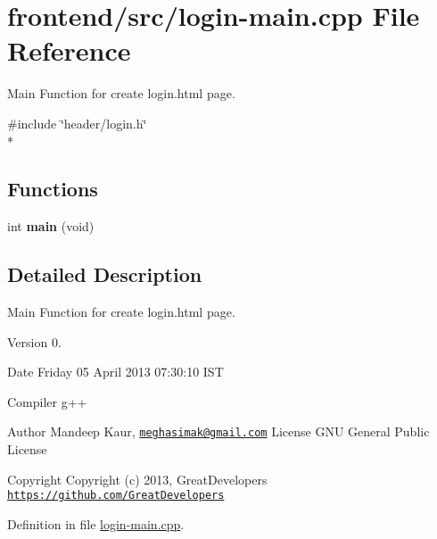 \hypertarget{login-main_8cpp}{\section{frontend/src/login-\/main.cpp File Reference}
\label{login-main_8cpp}
}


Main Function for create login.\-html page.  


{\ttfamily \#include \char`\"{}header/login.\-h\char`\"{}}\\*
\subsection*{Functions}
\begin{DoxyCompactItemize}
\item 
\hypertarget{login-main_8cpp_a840291bc02cba5474a4cb46a9b9566fe}{int {\bfseries main} (void)}\label{login-main_8cpp_a840291bc02cba5474a4cb46a9b9566fe}

\end{DoxyCompactItemize}


\subsection{Detailed Description}
Main Function for create login.\-html page. \begin{DoxyVersion}{Version}
0. 
\end{DoxyVersion}
\begin{DoxyDate}{Date}
Friday 05 April 2013 07\-:30\-:10 I\-S\-T\par
Compiler g++
\end{DoxyDate}
\begin{DoxyAuthor}{Author}
Mandeep Kaur, \href{mailto:meghasimak@gmail.com}{\tt meghasimak@gmail.\-com} License G\-N\-U General Public License 
\end{DoxyAuthor}
\begin{DoxyCopyright}{Copyright}
Copyright (c) 2013, Great\-Developers \href{https://github.com/GreatDevelopers}{\tt https\-://github.\-com/\-Great\-Developers} 
\end{DoxyCopyright}


Definition in file \hyperlink{login-main_8cpp_source}{login-\/main.\-cpp}.

